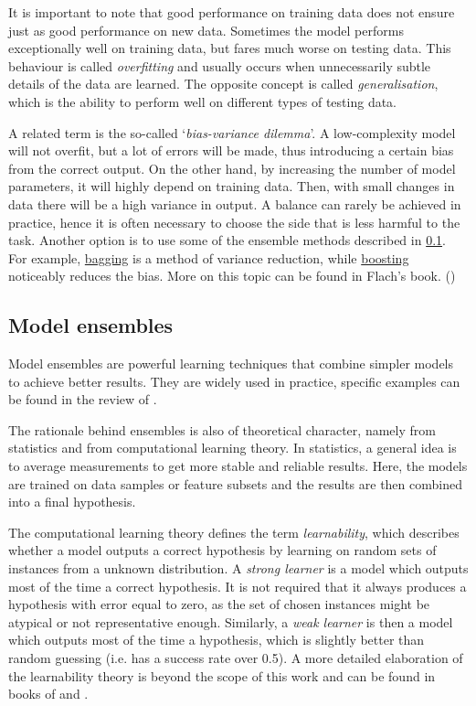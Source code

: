 It is important to note that good performance on training data does not ensure 
just as good performance on new data. Sometimes the model performs 
exceptionally well on training data, but fares much worse on testing data. 
This behaviour is called \emph{overfitting} and usually occurs when 
unnecessarily subtle details of the data are learned. The opposite concept 
is called \emph{generalisation}, which is the ability to perform well on 
different types of testing data.

A related term is the so-called `\emph{bias-variance dilemma}'. A 
low-complexity model will not overfit, but a lot of errors will be made, thus 
introducing a certain bias from the correct output. On the other hand, by 
increasing the number of model parameters, it will highly depend on training 
data. Then, with small changes in data there will be a high variance in 
output. A balance can rarely be achieved in practice, hence it is often 
necessary to choose the side that is less harmful to the task. Another option
is to use some of the ensemble methods described in \ref{ensemble}. For
example, \hyperref[bagging]{bagging} is a method of variance reduction, while
\hyperref[boosting]{boosting} noticeably reduces the bias. More on this topic
can be found in Flach's book. (\citet[p.~93--94,~338]{Flach:2012:MLA:2490546})


\subsection{Model ensembles} \label{ensemble}
Model ensembles are powerful learning techniques that combine simpler models 
to achieve better results. They are widely used in practice, specific examples
can be found in the review of \cite{Rokach:2009:TCE:1609202.1609436}.

The rationale behind ensembles is also of theoretical character, namely from
statistics and from computational learning theory. In statistics, a general
idea is to average measurements to get more stable and reliable results.
Here, the models are trained on data samples or feature subsets and the results
are then combined into a final hypothesis.

The computational learning theory defines the term \emph{learnability},
which describes whether a model outputs a correct hypothesis by learning on
random sets of instances from a unknown distribution. A \emph{strong learner}
is a model which outputs most of the time a correct hypothesis. It is not
required that it always produces a hypothesis with error equal to zero, as 
the set of chosen instances might be atypical or not representative enough.
Similarly, a \emph{weak learner} is then a model which outputs most of the time
a hypothesis, which is slightly better than random guessing (i.e. has a
success rate over 0.5). A more detailed elaboration of the learnability
theory is beyond the scope of this work and can be found in books 
of \citep{Flach:2012:MLA:2490546} and \citep{Mitchell:1997:ML:541177}.

